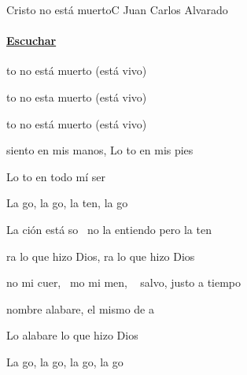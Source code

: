 \documentclass[12pt, spanish]{book}
\newcommand{\NotCCLIed}{\relax}
\begin{document}
    \begin{song}{Cristo no está muerto}{C}
        {} %
        {Juan Carlos Alvarado}
        {} %
        {} %
        \ifChordBk
        \paragraph{\mbox{}\hfill\protect\href{https://open.spotify.com/intl-es/track/66fuI104YsTUxpk4tYiC2F}{Escuchar}\mbox{}\hfill}
        \fi


        \begin{SBChorus}
            to no está muerto (está vivo)

            to no esta muerto (está vivo)

            to no está muerto (está vivo)
        \end{SBChorus}

        \begin{SBOpGroup}
             siento en mis manos, Lo to en mis pies

            Lo to en todo mí ser

            La go, la go, la ten, la go

            La ción está so~ no la entiendo pero la ten
        \end{SBOpGroup}
        \vskip 20pt
        \begin{SBOpGroup}
            ra lo que hizo Dios, ra lo que hizo Dios

            no mi cuer, ~mo mi men, ~ salvo, justo a tiempo

             nombre alabare,  el mismo de a~~

            Lo alabare  lo que hizo Dios~~~~~~~~
        \end{SBOpGroup}
        \vskip 20pt
        \begin{SBOpGroup}
            La go, la go, la go, la go


\end{SBOpGroup}
\end{song}
\end{document}

